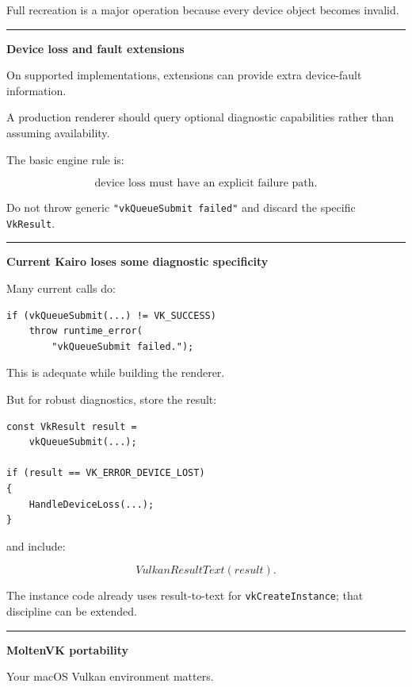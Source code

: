 Full recreation is a major operation because every device object becomes invalid.

\begin{center}\rule{0.5\linewidth}{0.5pt}\end{center}

\textbf{Device loss and fault extensions}

On supported implementations, extensions can provide extra device-fault information.

A production renderer should query optional diagnostic capabilities rather than assuming availability.

The basic engine rule is:

\[
\boxed{
\text{device loss must have an explicit failure path}.
}
\]

Do not throw generic \texttt{"vkQueueSubmit\ failed"} and discard the specific \texttt{VkResult}.

\begin{center}\rule{0.5\linewidth}{0.5pt}\end{center}

\textbf{Current Kairo loses some diagnostic specificity}

Many current calls do:

\begin{verbatim}
if (vkQueueSubmit(...) != VK_SUCCESS)
    throw runtime_error(
        "vkQueueSubmit failed.");
\end{verbatim}

This is adequate while building the renderer.

But for robust diagnostics, store the result:

\begin{verbatim}
const VkResult result =
    vkQueueSubmit(...);

if (result == VK_ERROR_DEVICE_LOST)
{
    HandleDeviceLoss(...);
}
\end{verbatim}

and include:

\[
VulkanResultText(result).
\]

The instance code already uses result-to-text for \texttt{vkCreateInstance}; that discipline can be extended.

\begin{center}\rule{0.5\linewidth}{0.5pt}\end{center}

\textbf{MoltenVK portability}

Your macOS Vulkan environment matters.

